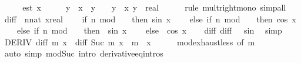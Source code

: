 \begin{isabellebody}
%
\isadelimproof
%
\endisadelimproof
%
\isatagproof
{}\isamarkupfalse%
\ {\isacharminus}{\kern0pt}\isanewline
\ \ \isamarkupfalse%
\ est{\isacharcolon}{\kern0pt}\ {\isachardoublequoteopen}x\ {\isasymle}\ {}\ {\isasymLongrightarrow}\ {}\ {\isasymle}\ y\ {\isasymLongrightarrow}\ x\ {\isacharasterisk}{\kern0pt}\ y\ {\isasymle}\ {}\ {\isacharasterisk}{\kern0pt}\ y{\isachardoublequoteclose}\ \ x\ y\ {\isacharcolon}{\kern0pt}{\isacharcolon}{\kern0pt}\ real\isanewline
\ \ \ \ \isamarkupfalse%
\ {\isacharparenleft}{\kern0pt}rule\ mult{\isacharunderscore}{\kern0pt}right{\isacharunderscore}{\kern0pt}mono{\isacharparenright}{\kern0pt}\ simp{\isacharunderscore}{\kern0pt}all\isanewline
\ \ \isamarkupfalse%
\ {\isacharquery}{\kern0pt}diff\ {\isacharequal}{\kern0pt}\ {\isachardoublequoteopen}{\isasymlambda}{\isacharparenleft}{\kern0pt}n{\isacharcolon}{\kern0pt}{\isacharcolon}{\kern0pt}nat{\isacharparenright}{\kern0pt}\ {\isacharparenleft}{\kern0pt}x{\isacharcolon}{\kern0pt}{\isacharcolon}{\kern0pt}real{\isacharparenright}{\kern0pt}{\isachardot}{\kern0pt}\isanewline
\ \ \ \ if\ n\ mod\ {}\ {\isacharequal}{\kern0pt}\ {}\ then\ sin\ x\isanewline
\ \ \ \ else\ if\ n\ mod\ {}\ {\isacharequal}{\kern0pt}\ {}\ then\ cos\ x\isanewline
\ \ \ \ else\ if\ n\ mod\ {}\ {\isacharequal}{\kern0pt}\ {}\ then\ {\isacharminus}{\kern0pt}\ sin\ x\isanewline
\ \ \ \ else\ {\isacharminus}{\kern0pt}\ cos\ x{\isachardoublequoteclose}\isanewline
\ \ \isamarkupfalse%
\ diff{\isacharunderscore}{\kern0pt}{}{\isacharcolon}{\kern0pt}\ {\isachardoublequoteopen}{\isacharquery}{\kern0pt}diff\ {}\ {\isacharequal}{\kern0pt}\ sin{\isachardoublequoteclose}\ \isamarkupfalse%
\ simp\isanewline
\ \ \isamarkupfalse%
\ {\isachardoublequoteopen}DERIV\ {\isacharparenleft}{\kern0pt}{\isacharquery}{\kern0pt}diff\ m{\isacharparenright}{\kern0pt}\ x\ {\isacharcolon}{\kern0pt}{\isachargreater}{\kern0pt}\ {\isacharquery}{\kern0pt}diff\ {\isacharparenleft}{\kern0pt}Suc\ m{\isacharparenright}{\kern0pt}\ x{\isachardoublequoteclose}\ \ m\ \ x\isanewline
\ \ \ \ \isamarkupfalse%
\ mod{\isacharunderscore}{\kern0pt}exhaust{\isacharunderscore}{\kern0pt}less{\isacharunderscore}{\kern0pt}{}\ {\isacharbrackleft}{\kern0pt}of\ m{\isacharbrackright}{\kern0pt}\isanewline
\ \ \ \ \isamarkupfalse%
\ {\isacharparenleft}{\kern0pt}auto\ simp{\isacharcolon}{\kern0pt}\ mod{\isacharunderscore}{\kern0pt}Suc\ intro{\isacharbang}{\kern0pt}{\isacharcolon}{\kern0pt}\ derivative{\isacharunderscore}{\kern0pt}eq{\isacharunderscore}{\kern0pt}intros{\isacharparenright}{\kern0pt}\isanewline

\end{isabellebody}
